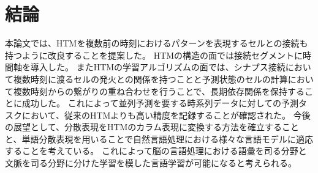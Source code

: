 \chapter{結論}
本論文では、HTMを複数前の時刻におけるパターンを表現するセルとの接続も持つように改良することを提案した。
HTMの構造の面では接続セグメントに時間軸を導入した。
またHTMの学習アルゴリズムの面では、シナプス接続において複数時刻に渡るセルの発火との関係を持つことと予測状態のセルの計算において複数時刻からの繋がりの重ね合わせを行うことで、長期依存関係を保持することに成功した。
これによって並列予測を要する時系列データに対しての予測タスクにおいて、従来のHTMよりも高い精度を記録することが確認された。
今後の展望として、分散表現をHTMのカラム表現に変換する方法を確立することと、単語分散表現を用いることで自然言語処理における様々な言語モデルに適応することを考えている。
これによって脳の言語処理における語彙を司る分野と文脈を司る分野に分けた学習を模した言語学習が可能になると考えられる。
